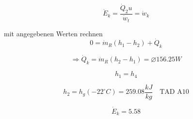 

\item[d)] \[ \dot{E}_k = \frac{\dot{Q}_2 u}{\dot{w}_t} = \dot{w}_k \]
    
    mit angegebenen Werten rechnen \\
    \[ 0 = \dot{m}_R (h_1 - h_2) + \dot{Q}_k \]
    
    \[
    \Rightarrow \dot{Q}_k = \dot{m}_R (h_2 - h_1) = \diameter 156.25 W
    \]
    
    \[
    h_1 = h_4
    \]
    
    \[
    h_2 = h_g (-22^\circ C) = 259.08 \frac{kJ}{kg} \quad \text{TAD A10}
    \]
    
    \[
    \dot{E}_k = 5.58
    \]